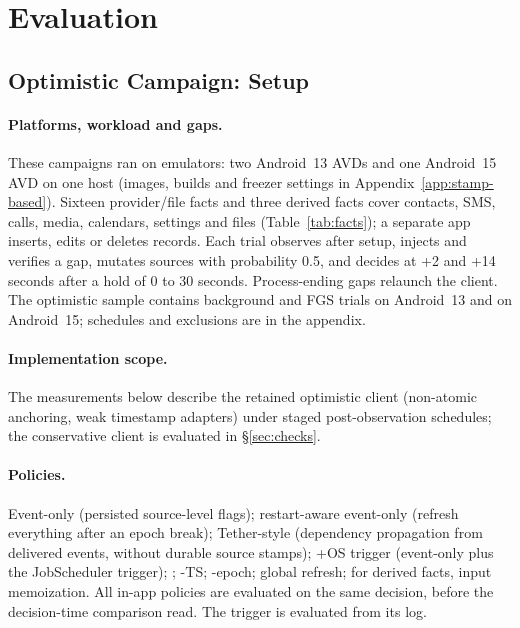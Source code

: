 \section{Evaluation}
\label{sec:eval}

\subsection{Optimistic Campaign: Setup}
\label{sec:eval-setup}

\paragraph{Platforms, workload and gaps.} These campaigns ran on emulators: two Android~13 AVDs and one Android~15 AVD on one host (images, builds and freezer settings in Appendix~\ref{app:stamp-based}). Sixteen provider/file facts and three derived facts cover contacts, SMS, calls, media, calendars, settings and files (Table~\ref{tab:facts}); a separate app inserts, edits or deletes records. Each trial observes after setup, injects and verifies a gap, mutates sources with probability 0.5, and decides at +2 and +14 seconds after a hold of 0 to 30 seconds. Process-ending gaps relaunch the client. The optimistic sample contains \ETwoBg background and \ETwoFg FGS trials on Android~13 and \ETwoApi on Android~15; schedules and exclusions are in the appendix.

\paragraph{Implementation scope.} The measurements below describe the retained optimistic client (non-atomic anchoring, weak timestamp adapters) under staged post-observation schedules; the conservative client is evaluated in \S\ref{sec:checks}.

\paragraph{Policies.} Event-only (persisted source-level flags); restart-aware event-only (refresh everything after an epoch break); Tether-style (dependency propagation from delivered events, without durable source stamps); +OS trigger (event-only plus the JobScheduler trigger); \stamp; \stamp-TS; \stamp-epoch; global refresh; for derived facts, input memoization. All in-app policies are evaluated on the same decision, before the decision-time comparison read. The trigger is evaluated from its log.

